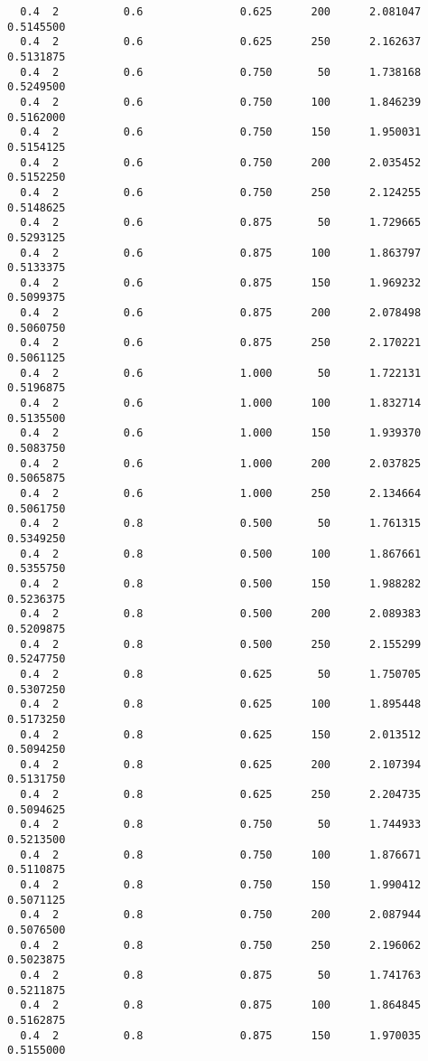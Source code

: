 \documentclass[
  letterpaper,
  DIV=11,
  numbers=noendperiod]{scrartcl}
\begin{document}
\begin{verbatim}
  0.4  2          0.6               0.625      200      2.081047  0.5145500
  0.4  2          0.6               0.625      250      2.162637  0.5131875
  0.4  2          0.6               0.750       50      1.738168  0.5249500
  0.4  2          0.6               0.750      100      1.846239  0.5162000
  0.4  2          0.6               0.750      150      1.950031  0.5154125
  0.4  2          0.6               0.750      200      2.035452  0.5152250
  0.4  2          0.6               0.750      250      2.124255  0.5148625
  0.4  2          0.6               0.875       50      1.729665  0.5293125
  0.4  2          0.6               0.875      100      1.863797  0.5133375
  0.4  2          0.6               0.875      150      1.969232  0.5099375
  0.4  2          0.6               0.875      200      2.078498  0.5060750
  0.4  2          0.6               0.875      250      2.170221  0.5061125
  0.4  2          0.6               1.000       50      1.722131  0.5196875
  0.4  2          0.6               1.000      100      1.832714  0.5135500
  0.4  2          0.6               1.000      150      1.939370  0.5083750
  0.4  2          0.6               1.000      200      2.037825  0.5065875
  0.4  2          0.6               1.000      250      2.134664  0.5061750
  0.4  2          0.8               0.500       50      1.761315  0.5349250
  0.4  2          0.8               0.500      100      1.867661  0.5355750
  0.4  2          0.8               0.500      150      1.988282  0.5236375
  0.4  2          0.8               0.500      200      2.089383  0.5209875
  0.4  2          0.8               0.500      250      2.155299  0.5247750
  0.4  2          0.8               0.625       50      1.750705  0.5307250
  0.4  2          0.8               0.625      100      1.895448  0.5173250
  0.4  2          0.8               0.625      150      2.013512  0.5094250
  0.4  2          0.8               0.625      200      2.107394  0.5131750
  0.4  2          0.8               0.625      250      2.204735  0.5094625
  0.4  2          0.8               0.750       50      1.744933  0.5213500
  0.4  2          0.8               0.750      100      1.876671  0.5110875
  0.4  2          0.8               0.750      150      1.990412  0.5071125
  0.4  2          0.8               0.750      200      2.087944  0.5076500
  0.4  2          0.8               0.750      250      2.196062  0.5023875
  0.4  2          0.8               0.875       50      1.741763  0.5211875
  0.4  2          0.8               0.875      100      1.864845  0.5162875
  0.4  2          0.8               0.875      150      1.970035  0.5155000

\end{verbatim}
\end{document}
